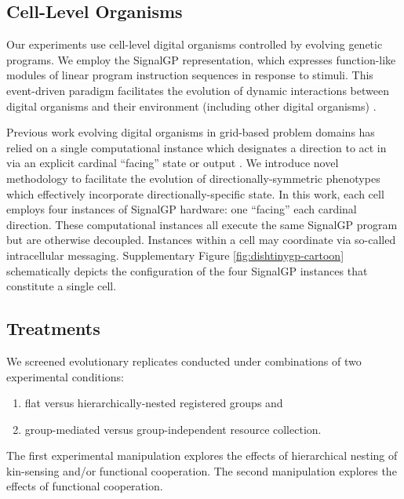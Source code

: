 \subsection{Cell-Level Organisms}

Our experiments use cell-level digital organisms controlled by evolving
genetic programs.
We employ the SignalGP representation, which expresses function-like modules of linear program instruction sequences in response to stimuli.
This event-driven paradigm facilitates the evolution of dynamic interactions between digital organisms and their environment (including other digital organisms) \citep{lalejini2018evolving}.

Previous work evolving digital organisms in grid-based problem domains has relied on a single computational instance which designates a direction to act in via an explicit cardinal ``facing'' state or output \citep{goldsby2014evolutionary, goldsby2018serendipitous, grabowski2010early, biswas2014causes, lalejini2018evolving}.
We introduce novel methodology to facilitate the evolution of directionally-symmetric phenotypes which effectively incorporate directionally-specific state.
In this work, each cell employs four instances of SignalGP hardware: one ``facing'' each cardinal direction.
These computational instances all execute the same SignalGP program but are otherwise decoupled. %
Instances within a cell may coordinate via so-called intracellular messaging.
Supplementary Figure \ref{fig:dishtinygp-cartoon} schematically depicts the configuration of the four SignalGP instances that constitute a single cell.

\subsection{Treatments}

We screened evolutionary replicates conducted under combinations of two experimental conditions:
\begin{enumerate}
\item flat versus hierarchically-nested registered groups and
\item group-mediated versus group-independent resource collection.
\end{enumerate}

The first experimental manipulation explores the effects of hierarchical nesting of kin-sensing and/or functional cooperation.
The second manipulation explores the effects of functional cooperation.

